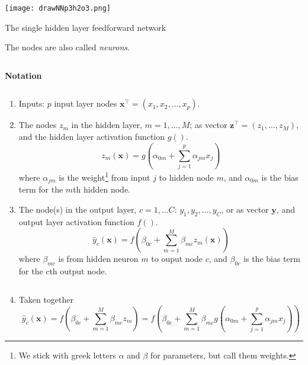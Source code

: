 \documentclass[
  10pt,
  ignorenonframetext,
]{beamer}
\providecommand{\tightlist}{%
  \setlength{\itemsep}{0pt}\setlength{\parskip}{0pt}}
\begin{document}
\begin{frame}
\centering

\texttt{[image: drawNNp3h2o3.png]}
\end{frame}

\begin{frame}
\begin{block}{The single hidden layer feedforward network}
\protect\hypertarget{the-single-hidden-layer-feedforward-network}{}
\(~\)

The nodes are also called \emph{neurons}.

\(~\)

\textbf{Notation}

\(~\)

\begin{enumerate}
\tightlist
\item
  Inputs: \(p\) input layer nodes
  \({\boldsymbol{x}^\top} = (x_1, x_2, \ldots, x_p)\).
\item
  The nodes \(z_m\) in the hidden layer, \(m=1,\ldots, M\); as vector
  \({\boldsymbol z}^\top=(z_1, \ldots, z_M)\), and the hidden layer
  activation function \(g()\). \[
  z_m({\boldsymbol x})=g(\alpha_{0m}+\sum_{j=1}^p \alpha_{jm}x_{j})
  \] where \(\alpha_{jm}\) is the
  weight\footnote{We stick with greek letters $\alpha$ and $\beta$ for parameters, but call them weights.}
  from input \(j\) to hidden node \(m\), and \(\alpha_{0m}\) is the bias
  term for the \(m\)th hidden node.
\end{enumerate}
\end{block}
\end{frame}

\begin{frame}
\begin{enumerate}
\setcounter{enumi}{2}
\tightlist
\item
  The node(s) in the output layer, \(c=1,\ldots C\):
  \(y_1, y_2, \ldots, y_C\), or as vector \({\boldsymbol y}\), and
  output layer activation function \(f()\). \[
  \hat{y}_c({\boldsymbol x})=f(\beta_{0c}+\sum_{m=1}^M \beta_{mc}z_{m}({\boldsymbol x}))
  \] where \(\beta_{mc}\) is from hidden neuron \(m\) to ouput node
  \(c\), and \(\beta_{0c}\) is the bias term for the \(c\)th output
  node.
\end{enumerate}

\(~\)

\begin{enumerate}
\setcounter{enumi}{3}
\tightlist
\item
  Taken together \[
  \hat{y}_c({\boldsymbol x})=f(\beta_{0c}+\sum_{m=1}^M \beta_{mc}z_{m})=f(\beta_{0c}+\sum_{m=1}^M \beta_{mc}g(\alpha_{0m}+\sum_{j=1}^p \alpha_{jm}x_{j}))
  \]
\end{enumerate}
\end{frame}
\end{document}
